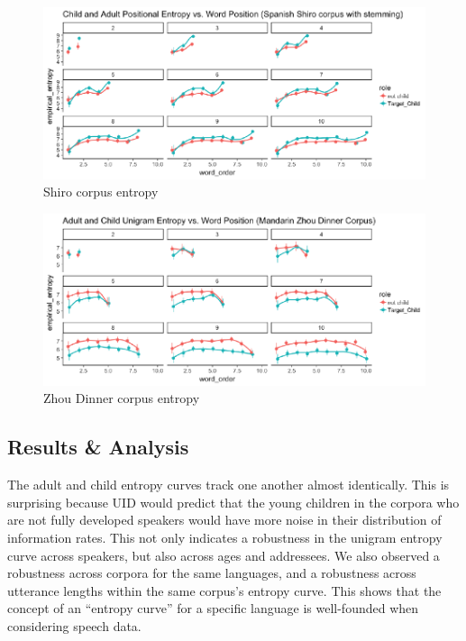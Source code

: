 \documentclass[10pt, letterpaper]{article}
\newenvironment{CodeChunk}{}{}
\begin{document}
\begin{CodeChunk}
\begin{figure}[h]

{\centering \includegraphics{figs/shiro_PE-1} 

}

\caption[Shiro corpus entropy]{Shiro corpus entropy}\label{fig:shiro_PE}
\end{figure}
\end{CodeChunk}

\begin{CodeChunk}
\begin{figure}[h]

{\centering \includegraphics{figs/zhou_PE-1} 

}

\caption[Zhou Dinner corpus entropy]{Zhou Dinner corpus entropy}\label{fig:zhou_PE}
\end{figure}
\end{CodeChunk}

\subsection{Results \& Analysis}\label{results-analysis}

The adult and child entropy curves track one another almost identically.
This is surprising because UID would predict that the young children in
the corpora who are not fully developed speakers would have more noise
in their distribution of information rates. This not only indicates a
robustness in the unigram entropy curve across speakers, but also across
ages and addressees. We also observed a robustness across corpora for
the same languages, and a robustness across utterance lengths within the
same corpus's entropy curve. This shows that the concept of an ``entropy
curve'' for a specific language is well-founded when considering speech
data.
\end{document}
